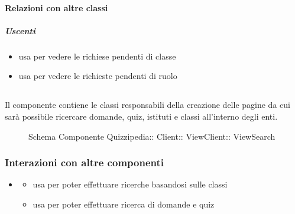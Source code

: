 \paragraph{Relazioni con altre classi}
\subparagraph{Uscenti}
\begin{itemize}
\item usa  per vedere le richiese pendenti di classe
\item usa  per vedere le richieste pendenti di ruolo
\end{itemize}
\subsection{}
Il componente contiene le classi responsabili della creazione delle pagine da cui sarà possibile ricercare domande, quiz, istituti e classi all'interno degli enti.
\begin{figure}[H]
\centering
\noindent{}
\caption[Schema Componente ViewSearch]{Schema Componente Quizzipedia:: Client:: ViewClient:: ViewSearch}
\end{figure}
\subsubsection{Interazioni con altre componenti}
\begin{itemize}
\item {}
\begin{itemize}
\item usa  per poter effettuare ricerche basandosi sulle classi
\item usa  per poter effettuare ricerca di domande e quiz
\end{itemize}
\end{itemize}
